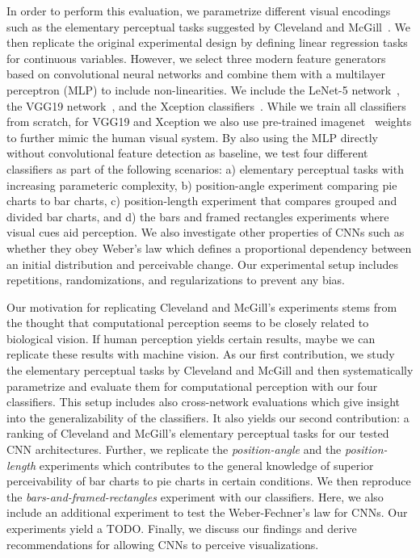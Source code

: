 In order to perform this evaluation, we parametrize different visual encodings such as the elementary perceptual tasks suggested by Cleveland and McGill~\cite{cleveland_mcgill}. We then replicate the original experimental design by defining linear regression tasks for continuous variables. However, we select three modern feature generators based on convolutional neural networks and combine them with a multilayer perceptron (MLP) to include non-linearities. We include the LeNet-5 network~\cite{lenet}, the VGG19 network~\cite{simonyan_very_deep2014}, and the Xception classifiers~\cite{xception}. While we train all classifiers from scratch, for VGG19 and Xception we also use pre-trained imagenet~\cite{imagenet} weights to further mimic the human visual system. By also using the MLP directly without convolutional feature detection as baseline, we test four different classifiers as part of the following scenarios: a) elementary perceptual tasks with increasing parameteric complexity, b) position-angle experiment comparing pie charts to bar charts, c) position-length experiment that compares grouped and divided bar charts, and d) the bars and framed rectangles experiments where visual cues aid perception. We also investigate other properties of CNNs such as whether they obey Weber's law which defines a proportional dependency between an initial distribution and perceivable change. Our experimental setup includes repetitions, randomizations, and regularizations to prevent any bias. 

Our motivation for replicating Cleveland and McGill's experiments stems from the thought that computational perception seems to be closely related to biological vision. If human perception yields certain results, maybe we can replicate these results with machine vision. As our first contribution, we study the elementary perceptual tasks by Cleveland and McGill and then systematically parametrize and evaluate them for computational perception with our four classifiers. This setup includes also cross-network evaluations which give insight into the generalizability of the classifiers. It also yields our second contribution: a ranking of Cleveland and McGill's elementary perceptual tasks for our tested CNN architectures. Further, we replicate the \emph{position-angle} and the \emph{position-length} experiments which contributes to the general knowledge of superior perceivability of bar charts to pie charts in certain conditions. We then reproduce the \emph{bars-and-framed-rectangles} experiment with our classifiers. Here, we also include an additional experiment to test the Weber-Fechner's law for CNNs. Our experiments yield a TODO. Finally, we discuss our findings and derive recommendations for allowing CNNs to perceive visualizations.

